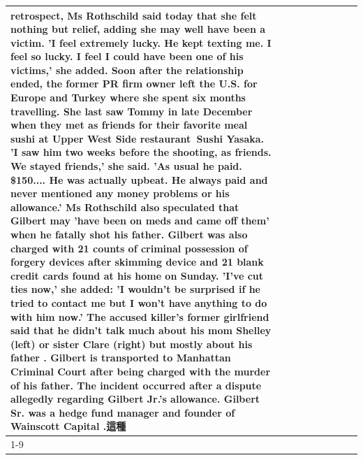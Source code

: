 \begin{table}[H]
\begin{tabular}{lllrlllll}
retrospect, Ms Rothschild said today that she felt nothing but relief, adding she may well have been a victim. 'I feel extremely lucky. He kept texting me. I feel so lucky. I feel I could have been one of his victims,' she added. Soon after the relationship ended, the former PR firm owner left the U.S. for Europe and Turkey where she spent six months  travelling. She last saw Tommy in late December when they met as friends for their favorite meal sushi at Upper West Side restaurant Sushi Yasaka. 'I saw him two weeks before the shooting, as friends. We stayed friends,' she said. 'As usual he paid. \$150.... He was actually upbeat. He always paid and never mentioned any money problems or his allowance.' Ms Rothschild also speculated that Gilbert may 'have been on meds and came off them' when he fatally shot his father. Gilbert was also charged with 21 counts of criminal possession of forgery devices after skimming device and 21 blank credit cards found at his home on Sunday. 'I've cut ties now,' she added: 'I wouldn’t be surprised if he tried to contact me but I won’t have anything to do with him now.' The accused killer's former girlfriend said that he didn't talk much about his mom Shelley (left) or sister Clare (right) but mostly about his father . Gilbert is transported to Manhattan Criminal Court  after being charged with the murder of his father. The incident occurred after a dispute allegedly regarding Gilbert Jr.'s allowance. Gilbert Sr. was a hedge fund manager and founder of Wainscott Capital .這種 \\
\cline{1-9}

\end{tabular}
\end{table}
